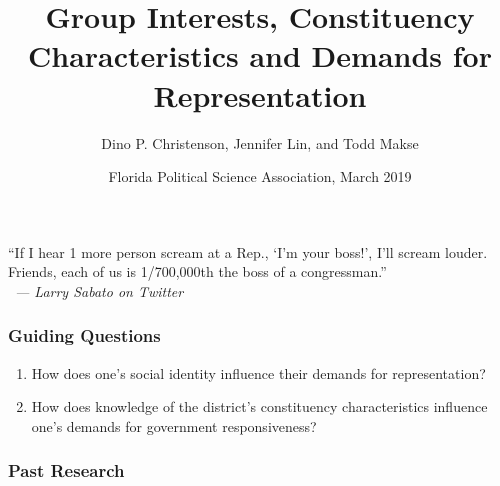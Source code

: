 \documentclass[14pt]{beamer}
\newcommand\e{\emph}
\begin{document}
\author[D. Christenson, J. Lin, and T. Makse] %
{Dino P. Christenson, Jennifer Lin, and Todd Makse}
\title[Demands for Representation]{Group Interests, Constituency Characteristics and Demands for Representation}
	\date[FPSA 2019]{Florida Political Science Association, March 2019}
	\begin{frame}[plain]
	\maketitle
\end{frame}

\begin{frame}
\frametitle{}
\begin{center}
	“If I hear 1 more person scream at a Rep., ‘I’m your boss!’, I’ll scream louder.
	Friends, each of us is 1/700,000th the boss of a congressman.”
\\\
	{\e {--- Larry Sabato on Twitter}}
\end{center}
\end{frame}

\begin{frame}
\frametitle{Guiding Questions}
\begin{enumerate}
	\item How does one's social identity influence their demands for representation?
	\item How does knowledge of the district's constituency characteristics influence one's demands for government responsiveness? 
\end{enumerate}
\end{frame}

\begin{frame}
\frametitle{Past Research}
\end{frame}
\end{document}
